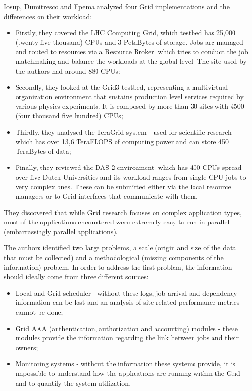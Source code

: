 Iosup, Dumitresco and Epema analyzed four Grid implementations and the differences on their workload:
\begin{itemize} 
\item Firstly, they covered the LHC Computing Grid, which testbed has 25,000 (twenty five thousand) CPUs and 3 PetaBytes of storage. Jobs are managed and routed to resources via a Resource Broker, which tries to conduct the job matchmaking and balance the workloads at the global level. The site used by the authors had around 880 CPUs;
\item Secondly, they looked at the Grid3 testbed, representing a multivirtual organization environment that sustains production level services required by various physics experiments. It is composed by more than 30 sites with 4500 (four thousand five hundred) CPUs;
\item Thirdly, they analysed the TeraGrid system - used for scientific research - which has over 13,6 TeraFLOPS of computing power and can store 450 TeraBytes of data;
\item Finally, they reviewed the DAS-2 environment, which has 400 CPUs spread over five Dutch Universities and its workload ranges from single CPU jobs to very complex ones. These can be submitted either via the local resource managers or to Grid interfaces that communicate with them. 
\end{itemize}

They discovered that while Grid research focuses on complex application types, most of the applications encountered were extremely easy to run in parallel (embarrassingly parallel applications).

The authors identified two large problems, a scale (origin and size of the data that must be collected) and a methodological (missing components of the information) problem. In order to address the first problem, the information should ideally come from three different sources:
\begin{itemize}
\item Local and Grid scheduler - without these logs, job arrival and dependency information can be lost and an analysis of site-related performance metrics cannot be done;
\item Grid AAA (authentication, authorization and accounting) modules - these modules provide the information regarding the link between jobs and their owners;
\item Monitoring systems - without the information these systems provide, it is impossible to understand how the applications are running within the Grid and to quantify the system utilization.
\end{itemize}


